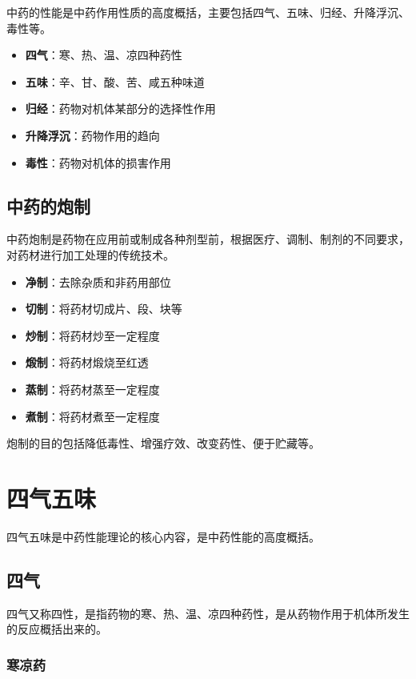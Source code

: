\documentclass[12pt,UTF8]{ctexbook}
\begin{document}
中药的性能是中药作用性质的高度概括，主要包括四气、五味、归经、升降浮沉、毒性等。

\begin{itemize}
\item \textbf{四气}：寒、热、温、凉四种药性
\item \textbf{五味}：辛、甘、酸、苦、咸五种味道
\item \textbf{归经}：药物对机体某部分的选择性作用
\item \textbf{升降浮沉}：药物作用的趋向
\item \textbf{毒性}：药物对机体的损害作用
\end{itemize}

\subsection{中药的炮制}

中药炮制是药物在应用前或制成各种剂型前，根据医疗、调制、制剂的不同要求，对药材进行加工处理的传统技术。

\begin{itemize}
\item \textbf{净制}：去除杂质和非药用部位
\item \textbf{切制}：将药材切成片、段、块等
\item \textbf{炒制}：将药材炒至一定程度
\item \textbf{煅制}：将药材煅烧至红透
\item \textbf{蒸制}：将药材蒸至一定程度
\item \textbf{煮制}：将药材煮至一定程度
\end{itemize}

炮制的目的包括降低毒性、增强疗效、改变药性、便于贮藏等。

\section{四气五味}

四气五味是中药性能理论的核心内容，是中药性能的高度概括。

\subsection{四气}

四气又称四性，是指药物的寒、热、温、凉四种药性，是从药物作用于机体所发生的反应概括出来的。

\subsubsection{寒凉药}
\end{document}
